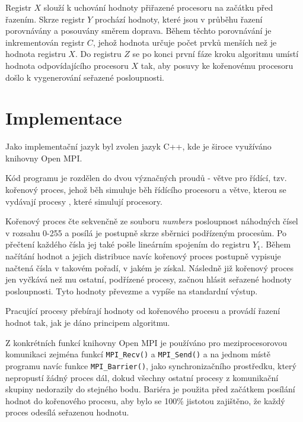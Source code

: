 \documentclass[a4paper,10pt]{article}
\newcommand{\Omicron}{O}
\begin{document}
    	\par Registr $X$ slouží k uchování hodnoty přiřazené procesoru na začátku před řazením. Skrze registr $Y$ prochází hodnoty, které jsou v průběhu řazení porovnávány a posouvány směrem doprava. Během těchto porovnávání je inkrementován registr $C$, jehož hodnota určuje počet prvků menších než je hodnota registru $X$. Do registru $Z$ se po konci první fáze kroku algoritmu umístí hodnota odpovídajícího procesoru $X$ tak, aby posuvy ke kořenovému procesoru došlo k vygenerování seřazené posloupnosti.


	\section{Implementace}
    	\par Jako implementační jazyk byl zvolen jazyk C++, kde je široce využíváno knihovny Open MPI. 
    	\par Kód programu je rozdělen do dvou význačných proudů \-- větve pro řídící, tzv. kořenový proces, jehož běh simuluje běh řídícího procesoru a větve, kterou se vydávají procesy , které simulují  procesory.

    	\par Kořenový proces čte sekvenčně ze souboru \textit{numbers} posloupnost náhodných čísel v rozsahu 0-255 a posílá je postupně skrze sběrnici podřízeným procesům. Po přečtení každého čísla jej také pošle lineárním spojením do registru $Y_1$. Během načítání hodnot a jejich distribuce navíc kořenový proces postupně vypisuje načtená čísla v takovém pořadí, v jakém je získal. Následně již kořenový proces jen vyčkává než mu ostatní, podřízené procesy, začnou hlásit seřazené hodnoty posloupnosti. Tyto hodnoty převezme a vypíše na standardní výstup.
    	
    	\par Pracující procesy přebírají hodnoty od kořenového procesu a provádí řazení hodnot tak, jak je dáno principem algoritmu. 
    	
    	\par Z konkrétních funkcí knihovny Open MPI je používáno pro meziprocesorovou komunikaci zejména funkcí \texttt{MPI\_Recv()} a \texttt{MPI\_Send()} a na jednom místě programu navíc funkce \texttt{MPI\_Barrier()}, jako synchronizačního prostředku, který nepropustí žádný proces dál, dokud všechny ostatní procesy z komunikační skupiny nedorazily do stejného bodu. Bariéra je použita před začátkem posílání hodnot do kořenového procesu, aby bylo se 100\% jistotou zajištěno, že každý proces odesílá seřazenou hodnotu.
\end{document}
